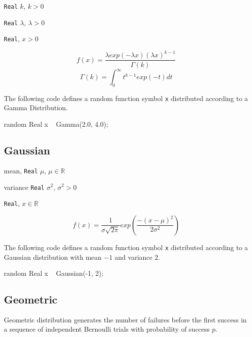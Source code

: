 \begin{itemize*}
\item[] \verb|Real| $k$, $k > 0$
\item[] \verb|Real| $\lambda$, $\lambda > 0$ 
\end{itemize*}

\begin{itemize*}
\item[] \verb|Real|, $x > 0$
\end{itemize*}

\[
	f(x) = \frac{\lambda exp(-\lambda x) (\lambda x)^{k-1}}{\Gamma(k)}
\]
\[
	\Gamma(k) = \int_{0}^{\infty} t^{k-1}exp(-t) dt
\]

The following code defines a random function symbol \verb|x| distributed according to a Gamma Distribution.
\begin{blogcode}
random Real x ~ Gamma(2.0, 4.0);
\end{blogcode}

\subsection{Gaussian}

\begin{itemize*}
\item[] mean, \verb|Real|
 $\mu$, $\mu \in \mathbb{R}$
\item[] variance \verb|Real|
 $\sigma^2$, $\sigma^2 > 0$ 
\end{itemize*}

\begin{itemize*}
\item[] \verb|Real|, $x \in \mathbb{R}$ 
\end{itemize*}

\[
	f(x) = \frac{1}{\sigma \sqrt{2 \pi}} exp(\frac{-(x-\mu)^{2}}{2 \sigma^{2}})
\]

The following code defines a random function symbol \verb|x| distributed according to a Gaussian distribution with mean $-1$ and variance $2$.
\begin{blogcode}
random Real x ~ Gaussian(-1, 2);
\end{blogcode}

\subsection{Geometric}
Geometric distribution generates the number of failures before the first success in a sequence of independent Bernoulli trials with probability of success $p$.

